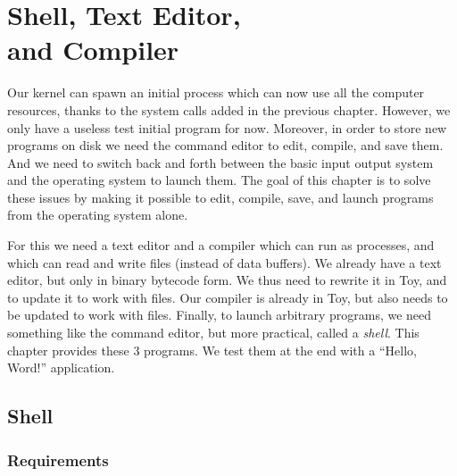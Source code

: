 
\renewcommand{\rustfile}{chapter5}
\setcounter{rustid}{0}


\chapter[Shell, Text Editor, and Compiler]{Shell, Text Editor,\\and
Compiler}\label{chapter:shell}

Our kernel can spawn an initial process which can now use all the computer
resources, thanks to the system calls added in the previous chapter. However,
we only have a useless test initial program for now. Moreover, in order to
store new programs on disk we need the command editor to edit, compile, and
save them. And we need to switch back and forth between the basic input output
system and the operating system to launch them. The goal of this chapter is to
solve these issues by making it possible to edit, compile, save, and launch
programs from the operating system alone.

For this we need a text editor and a compiler which can run as processes, and
which can read and write files (instead of data buffers). We already have a
text editor, but only in binary bytecode form. We thus need to rewrite it in
Toy, and to update it to work with files. Our compiler is already in Toy, but
also needs to be updated to work with files. Finally, to launch arbitrary
programs, we need something like the command editor, but more practical, called
a {\em shell}. This chapter provides these 3 programs. We test them at the
end with a ``Hello, Word!'' application.

\section{Shell}

\subsection{Requirements}

